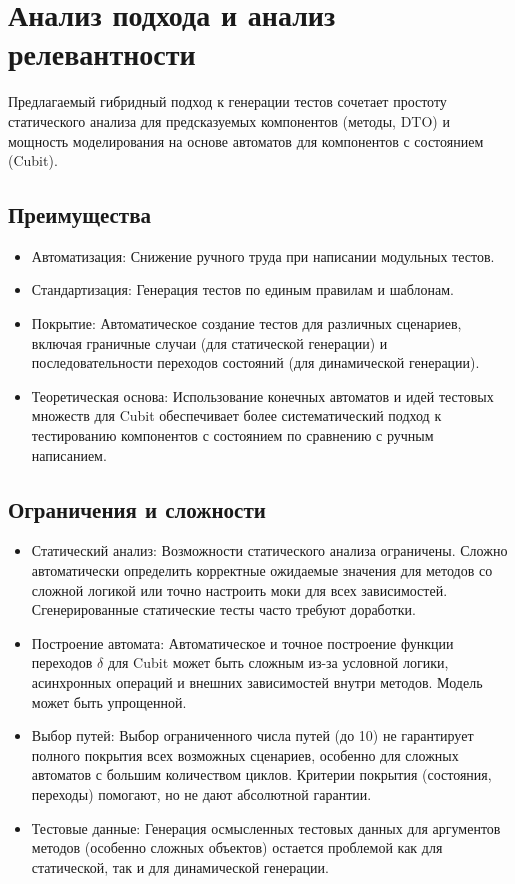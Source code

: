 \documentclass[14pt, russian]{scrartcl}
\begin{document}
\section{Анализ подхода и анализ релевантности}

Предлагаемый гибридный подход к генерации тестов сочетает простоту статического анализа для предсказуемых компонентов (методы, DTO) и мощность моделирования на основе автоматов для компонентов с состоянием (Cubit).

\subsection{Преимущества}

\begin{itemize}
    \item {Автоматизация:} Снижение ручного труда при написании модульных тестов.
    \item {Стандартизация:} Генерация тестов по единым правилам и шаблонам.
    \item {Покрытие:} Автоматическое создание тестов для различных сценариев, включая граничные случаи (для статической генерации) и последовательности переходов состояний (для динамической генерации).
    \item {Теоретическая основа:} Использование конечных автоматов и идей тестовых множеств для Cubit обеспечивает более систематический подход к тестированию компонентов с состоянием по сравнению с ручным написанием.
\end{itemize}

\subsection{Ограничения и сложности}

\begin{itemize}
    \item {Статический анализ:} Возможности статического анализа ограничены. Сложно автоматически определить корректные ожидаемые значения для методов со сложной логикой или точно настроить моки для всех зависимостей. Сгенерированные статические тесты часто требуют доработки.
    \item {Построение автомата:} Автоматическое и точное построение функции переходов $\delta$ для Cubit может быть сложным из-за условной логики, асинхронных операций и внешних зависимостей внутри методов. Модель может быть упрощенной.
    \item {Выбор путей:} Выбор ограниченного числа путей (до 10) не гарантирует полного покрытия всех возможных сценариев, особенно для сложных автоматов с большим количеством циклов. Критерии покрытия (состояния, переходы) помогают, но не дают абсолютной гарантии.
    \item {Тестовые данные:} Генерация осмысленных тестовых данных для аргументов методов (особенно сложных объектов) остается проблемой как для статической, так и для динамической генерации.
\end{itemize}
\end{document}
